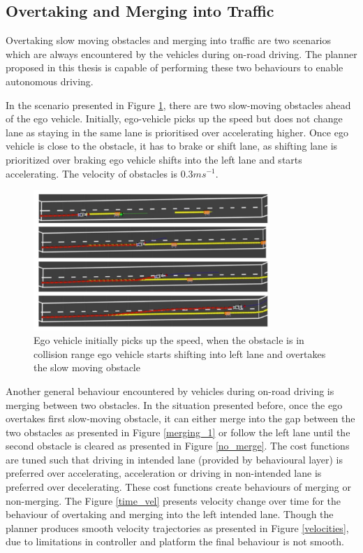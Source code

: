 \subsection{Overtaking and Merging into Traffic}

Overtaking slow moving obstacles and merging into traffic are two scenarios which are always encountered by the vehicles during on-road driving. The planner proposed in this thesis is capable of performing these two behaviours to enable autonomous driving. 

In the scenario presented in Figure \ref{slow_moving_1}, there are two slow-moving obstacles ahead of the ego vehicle. Initially, ego-vehicle picks up the speed but does not change lane as staying in the same lane is prioritised over accelerating higher. Once ego vehicle is close to the obstacle, it has to brake or shift lane, as shifting lane is prioritized over braking ego vehicle shifts into the left lane and starts accelerating. The velocity of obstacles is $0.3ms^{-1}$. 

\begin{figure}
	\centering
	\includegraphics[width=0.8\textwidth]{Images/evaluation/overtake_1.jpg}
	\caption{Ego vehicle initially picks up the speed, when the obstacle is in collision range ego vehicle starts shifting into left lane and overtakes the slow moving obstacle}
	\label{slow_moving_1}
\end{figure}


Another general behaviour encountered by vehicles during on-road driving is merging between two obstacles. In the situation presented before, once the ego overtakes first slow-moving obstacle, it can either merge into the gap between the two obstacles as presented in Figure \ref{merging_1} or follow the left lane until the second obstacle is cleared as presented in Figure \ref{no_merge}. The cost functions are tuned such that driving in intended lane (provided by behavioural layer) is preferred over accelerating, acceleration or driving in non-intended lane is preferred over decelerating. These cost functions create behaviours of merging or non-merging. The Figure \ref{time_vel} presents velocity change over time for the behaviour of overtaking and merging into the left intended lane. Though the planner produces smooth velocity trajectories as presented in Figure \ref{velocities}, due to limitations in controller and platform the final behaviour is not smooth.

